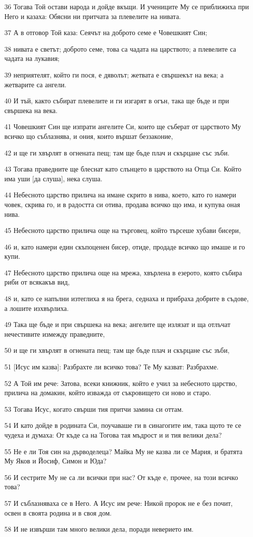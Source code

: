 \par 36 Тогава Той остави народа и дойде вкъщи. И учениците Му се приближиха при Него и казаха: Обясни ни притчата за плевелите на нивата.
\par 37 А в отговор Той каза: Сеячът на доброто семе е Човешкият Син;
\par 38 нивата е светът; доброто семе, това са чадата на царството; а плевелите са чадата на лукавия;
\par 39 неприятелят, който ги пося, е дяволът; жетвата е свършекът на века; а жетварите са ангели.
\par 40 И тъй, както събират плевелите и ги изгарят в огън, така ще бъде и при свършека на века.
\par 41 Човешкият Син ще изпрати ангелите Си, които ще съберат от царството Му всичко що съблазнява, и ония, които вършат беззаконие,
\par 42 и ще ги хвърлят в огнената пещ; там ще бъде плач и скърцане със зъби.
\par 43 Тогава праведните ще блеснат като слънцето в царството на Отца Си. Който има уши [да слуша], нека слуша.
\par 44 Небесното царство прилича на имане скрито в нива, което, като го намери човек, скрива го, и в радостта си отива, продава всичко що има, и купува оная нива.
\par 45 Небесното царство прилича още на търговец, който търсеше хубави бисери,
\par 46 и, като намери един скъпоценен бисер, отиде, продаде всичко що имаше и го купи.
\par 47 Небесното царство прилича още на мрежа, хвърлена в езерото, която събира риби от всякакъв вид,
\par 48 и, като се напълни изтеглиха я на брега, седнаха и прибраха добрите в съдове, а лошите изхвърлиха.
\par 49 Така ще бъде и при свършека на века; ангелите ще излязат и ща отлъчат нечестивите измежду праведните,
\par 50 и ще ги хвърлят в огнената пещ; там ще бъде плач и скърцане със зъби,
\par 51 [Исус им казва]: Разбрахте ли всичко това? Те Му казват: Разбрахме.
\par 52 А Той им рече: Затова, всеки книжник, който е учил за небесното царство, прилича на домакин, който изважда от съкровището си ново и старо.
\par 53 Тогава Исус, когато свърши тия притчи замина си оттам.
\par 54 И като дойде в родината Си, поучаваше ги в синагогите им, така щото те се чудеха и думаха: От къде са на Тогова тая мъдрост и и тия велики дела?
\par 55 Не е ли Тоя син на дърводелеца? Майка Му не казва ли се Мария, и братята Му Яков и Йосиф, Симон и Юда?
\par 56 И сестрите Му не са ли всички при нас? От къде е, прочее, на този всичко това?
\par 57 И съблазняваха се в Него. А Исус им рече: Никой пророк не е без почит, освен в своята родина и в своя дом.
\par 58 И не извърши там много велики дела, поради неверието им.

